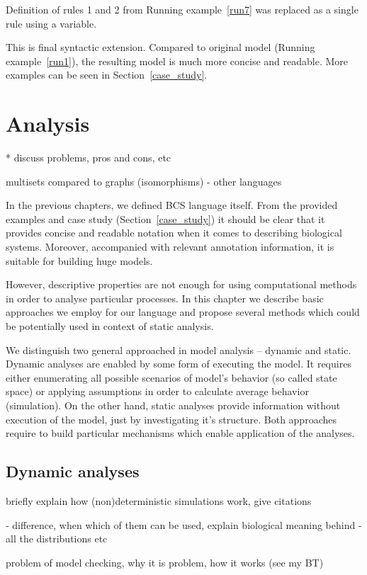 \documentclass[12pt]{fithesis2}
\begin{document}
\noindent Definition of rules 1 and 2 from Running example~\ref{run7} was replaced as a single rule using a variable.

This is final syntactic extension. Compared to original model (Running example~\ref{run1}), the resulting model is much more concise and readable. More examples can be seen in Section~\ref{case_study}.

\chapter{Analysis}

* discuss problems, pros and cons, etc

multisets compared to graphs (isomorphisms) - other languages

In the previous chapters, we defined BCS language itself. From the provided examples and case study (Section~\ref{case_study}) it should be clear that it provides concise and readable notation when it comes to describing biological systems. Moreover, accompanied with relevant annotation information, it is suitable for building huge models.

However, descriptive properties are not enough for using computational methods in order to analyse particular processes. In this chapter we describe basic approaches we employ for our language and propose several methods which could be potentially used in context of static analysis.

We distinguish two general approached in model analysis -- dynamic and static. Dynamic analyses are enabled by some form of executing the model. It requires either enumerating all possible scenarios of model's behavior (so called state space) or applying assumptions in order to calculate average behavior (simulation). On the other hand, static analyses provide information without execution of the model, just by investigating it's structure. Both approaches require to build particular mechanisms which enable application of the analyses.

\section{Dynamic analyses}

briefly explain how (non)deterministic simulations work, give citations

 - difference, when which of them can be used, explain biological meaning behind
 - all the distributions etc

problem of model checking, why it is problem, how it works (see my BT) 
\end{document}
